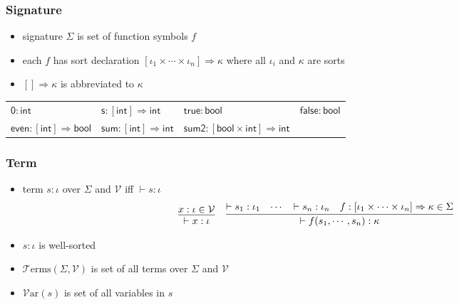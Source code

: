 \documentclass[12pt,aspectratio=169]{beamer}
\newcommand{\m}[1]{\mathsf{#1}}
\newcommand{\VV}{\mathcal{V}}
\newcommand{\TT}{\mathcal{T}}
\newcommand{\Var}{\mathcal{V}\mathrm{ar}}
\newcommand{\Terms}{\TT\mathrm{erms}}
\begin{document}
\begin{frame}
    \frametitle{Signature}
    \begin{definition}[signature]
        \begin{itemize}
        \item \alert{signature} $\Sigma$ is set of function symbols $f$
        \item each $f$ has \alert{sort declaration}
        $[\iota_1 \times \cdots \times \iota_n] \Rightarrow \kappa$
        where all $\iota_i$ and $\kappa$ are sorts
        \item $[] \Rightarrow \kappa$ is abbreviated to $\kappa$
    \end{itemize}
    \end{definition}
    \begin{example}
    \begin{tabular}{llll}
        $\m{0} : \m{int}$ & $\m{s} : [\m{int}] \Rightarrow \m{int}$ & $\m{true} : \m{bool}$ & $\m{false} : \m{bool}$ \\
        $\m{even} : [\m{int}] \Rightarrow \m{bool}$ &
        $\m{sum} : [\m{int}] \Rightarrow \m{int}$ & $\m{sum2} : [\m{bool} \times \m{int}] \Rightarrow \m{int}$ &
    \end{tabular}
    \end{example}
\end{frame}

\begin{frame}
    \frametitle{Term}
    \begin{definition}[term]
        \begin{itemize}
        \item \alert{term} $s : \iota$ over $\Sigma$ and $\VV$ iff
        $\vdash s : \iota$
        \begin{align*}
            \infer{\vdash x : \iota}{x : \iota \in \VV} \;\;\;\;
                & \infer{\vdash f(s_1,\cdots, s_n) : \kappa}
                    {\vdash s_1 : \iota_1 & \cdots & \vdash s_n : \iota_n
                    & f:[\iota_1 \times \cdots \times \iota_n]
                    \Rightarrow \kappa \in \Sigma}
        \end{align*}
        \item $s : \iota$ is \alert{well-sorted}
        \item \alert{$\Terms(\Sigma, \VV)$} is set of all terms over $\Sigma$ and $\VV$
        \item \alert{$\Var(s)$} is set of all variables in $s$
        \end{itemize}
    \end{definition}
\end{frame}
\end{document}
